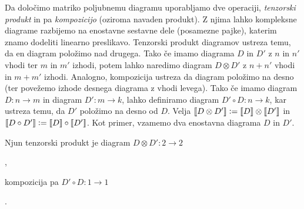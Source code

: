 \documentclass[mat1]{fmfdelo}
\newcommand{\interpret}[1]{\left\llbracket #1 \right\rrbracket}
\newcommand{\defeq}{\vcentcolon=}
\begin{document}
Da določimo matriko poljubnemu diagramu uporabljamo dve operaciji, \emph{tenzorski produkt} in pa \emph{kompozicijo} (oziroma navaden produkt). Z njima lahko kompleksne diagrame razbijemo na enostavne sestavne dele (posamezne pajke), katerim znamo dodeliti linearno preslikavo. Tenzorski produkt diagramov ustreza temu, da en diagram položimo nad drugega. Tako če imamo diagrama \(D\) in \(D'\) z \(n\) in \(n'\) vhodi ter \(m\) in \(m'\) izhodi, potem lahko naredimo diagram \(D\otimes D'\) z \(n+n'\) vhodi in \(m+m'\) izhodi. Analogno, kompozicija ustreza da diagram položimo na desno (ter povežemo izhode desnega diagrama z vhodi levega). Tako če imamo diagram \(D:n\to m\) in diagram \(D':m\to k\), lahko definiramo diagram \(D'\circ D: n\to k\), kar ustreza temu, da \(D'\) položimo na desno od \(D\). Velja \(\interpret{D\otimes D'}\defeq \interpret{D} \otimes \interpret{D'}\) in \(\interpret{D\circ D'} \defeq \interpret{D}\circ \interpret{ D'}\). Kot primer, vzamemo dva enostavna diagrama \(D\) in \(D'\).
\begin{center}
\end{center}
Njun tenzorski produkt je diagram \(D\otimes D':2\to 2\)
\begin{center}
    ,
\end{center}
kompozicija pa \(D'\circ D: 1\to 1\)
\begin{center}
    .
\end{center}
\end{document}
